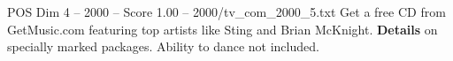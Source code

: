 \begin{textsample}{POS Dim 4 – 2000 – Score 1.00 – 2000/tv\_com\_2000\_5.txt}  \label{ex:f4_pos_078}
Get a free CD from GetMusic.com featuring top artists like Sting and Brian McKnight. \textbf{Details} on specially marked packages.
Ability to dance not included.

\end{textsample}

